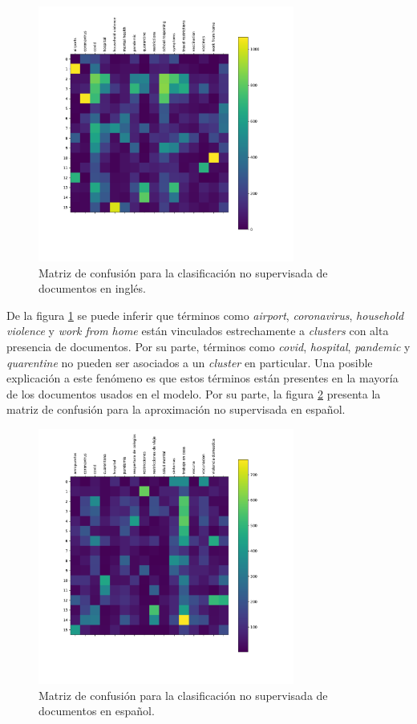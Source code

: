 \begin{figure}[H]
    \centering
    \includegraphics[width=0.75\textwidth]{results/AutomaticIdentification/cf_en.pdf}
    \caption{Matriz de confusión para la clasificación no supervisada de documentos en inglés.}
    \label{fig:dc_cm_en}
\end{figure}

De la figura \ref{fig:dc_cm_en} se puede inferir que términos como \textit{airport}, \textit{coronavirus}, \textit{household violence} y \textit{work from home} están vinculados estrechamente a \textit{clusters} con alta presencia de documentos. Por su parte, términos como \textit{covid}, \textit{hospital}, \textit{pandemic} y \textit{quarentine} no pueden ser asociados a un \textit{cluster} en particular. Una posible explicación a este fenómeno es que estos términos están presentes en la mayoría de los documentos usados en el modelo. Por su parte, la figura \ref{fig:dc_cm_es} presenta la matriz de confusión para la aproximación no supervisada en español. \\

\begin{figure}[H]
    \centering
    \includegraphics[width=0.75\textwidth]{results/AutomaticIdentification/cf_es.pdf}
    \caption{Matriz de confusión para la clasificación no supervisada de documentos en español.}
    \label{fig:dc_cm_es}
\end{figure}

